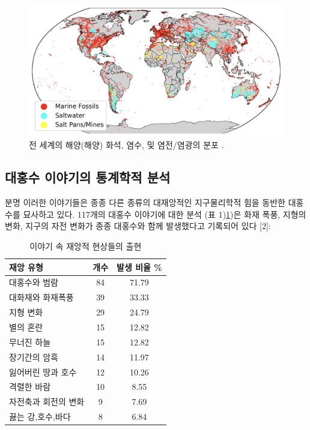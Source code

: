 \documentclass[10pt,twocolumn,letterpaper]{article}
\begin{document}
\begin{figure}[t]
\begin{center}
\includegraphics[width=1\textwidth]{marine.jpg}
\end{center}
   \caption{전 세계의 해양(해양) 화석, 염수, 및 염전/염광의 분포 \cite{15,16,86,87}.}
   \label{fig:2}
\end{figure}

\subsection{대홍수 이야기의 통계학적 분석}

분명  이러한 이야기들은 종종 다른 종류의 대재앙적인 지구물리학적 힘을 동반한 대홍수를 묘사하고 있다. 117개의 대홍수 이야기에 대한 분석 (표 1)\ref{tab: 1})은 화재 폭풍, 지형의 변화, 지구의 자전 변화가 종종 대홍수와 함께 발생했다고 기록되어 있다 [2]\cite{14}:

\begin{table}[ht]
\begin{center}
\renewcommand{\arraystretch}{1.2}  
\begin{tabular}{|l|c|c|}
\hline
\textbf{재앙 유형} & \textbf{개수} & \textbf{발생 비율 \%} \\
\hline\hline
대홍수와 범람                   & 84 & 71.79 \\
대화재와 화재폭풍         & 39 & 33.33 \\
지형 변화               & 29 & 24.79 \\
별의 혼란               & 15 & 12.82 \\
무너진 하늘               & 15 & 12.82 \\
장기간의 암흑               & 14 & 11.97 \\
잃어버린 땅과 호수      & 12 & 10.26 \\
격렬한 바람           & 10 & 8.55  \\
자전축과 회전의 변화            & 9 & 7.69  \\
끓는 강,호수,바다       & 8 & 6.84 \\
\hline
\end{tabular}
\end{center}
\caption{이야기 속 재앙적 현상들의 출현 }
\label{tab: 1}
\end{table}
\end{document}
